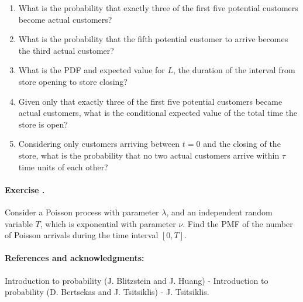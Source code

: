 \documentclass[twocolumn,12pt,a4paper]{article}
\newcounter{num}  %
\begin{document}
		\begin{enumerate}
			\item What is the probability that exactly three of the first five potential customers become actual customers?
			\item What is the probability that the fifth potential customer to arrive becomes the third actual customer?
			\item What is the PDF and expected value for $ L $, the duration of the interval from store opening to store closing?
			\item Given only that exactly three of the first five potential customers became actual customers, what is the conditional expected value of the total time the store is open?
			\item Considering only customers arriving between $ t = 0 $ and the closing of the store, what is the probability that no two actual customers arrive within $ \tau $ time units of each other?
		\end{enumerate}
		
		
	\paragraph{Exercise \thenum.}
	Consider a Poisson process with parameter $ \lambda $, and an independent random variable $ T $, which is exponential with parameter $ \nu $. Find the PMF of the number of Poisson arrivals during the time interval $ [0, T] $.

		
	
	\paragraph{References and acknowledgments:} Introduction to probability (J. Blitzstein and J. Huang) - Introduction to probability (D. Bertsekas and J.  Tsitsiklis) - J.  Tsitsiklis.
\end{document}
